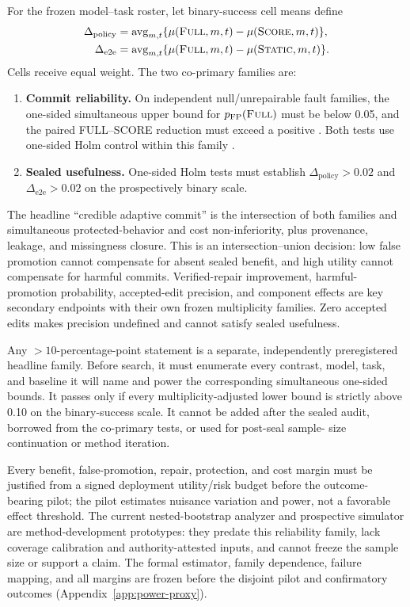 For the frozen model--task roster, let binary-success cell means define
\begin{align}
\Delta_{\mathrm{policy}}
  &= \operatorname{avg}_{m,t}\{\mu(\text{\textsc{Full}},m,t)
       -\mu(\text{\textsc{Score}},m,t)\},\\
\Delta_{\mathrm{e2e}}
  &= \operatorname{avg}_{m,t}\{\mu(\text{\textsc{Full}},m,t)
       -\mu(\text{\textsc{Static}},m,t)\}.
\end{align}
Cells receive equal weight.  The two co-primary families are:
\begin{enumerate}
  \item \textbf{Commit reliability.}  On independent null/unrepairable fault
  families, the one-sided simultaneous upper bound for
  \(p_{\mathrm{FP}}(\text{\textsc{Full}})\) must be below 0.05, and the paired
  FULL--SCORE reduction must exceed a positive
  .
  Both tests use one-sided Holm control within this family
  \citep{holm1979simple}.
  \item \textbf{Sealed usefulness.}  One-sided Holm tests must establish
  \(\Delta_{\mathrm{policy}}>0.02\) and
  \(\Delta_{\mathrm{e2e}}>0.02\) on the prospectively binary scale.
\end{enumerate}
The headline ``credible adaptive commit'' is the intersection of both families
and simultaneous protected-behavior and cost non-inferiority, plus provenance,
leakage, and missingness closure.  This is an intersection--union decision: low
false promotion cannot compensate for absent sealed benefit, and high utility
cannot compensate for harmful commits.  Verified-repair improvement, harmful-
promotion probability, accepted-edit precision, and component effects are key
secondary endpoints with their own frozen multiplicity families.  Zero accepted
edits makes precision undefined and cannot satisfy sealed usefulness.

Any \(>10\)-percentage-point statement is a separate, independently
preregistered headline family.  Before search, it must enumerate every contrast,
model, task, and baseline it will name and power the corresponding simultaneous
one-sided bounds.  It passes only if every multiplicity-adjusted lower bound is
strictly above 0.10 on the binary-success scale.  It cannot be added after the
sealed audit, borrowed from the co-primary tests, or used for post-seal sample-
size continuation or method iteration.

Every benefit, false-promotion, repair, protection, and cost margin must be
justified from a signed deployment utility/risk budget before the outcome-
bearing pilot; the pilot estimates nuisance variation and power, not a favorable
effect threshold.  The current nested-bootstrap analyzer and prospective simulator are
method-development prototypes: they predate this reliability family, lack
coverage calibration and authority-attested inputs, and cannot freeze the
sample size or support a claim.  The formal estimator, family dependence,
failure mapping, and all margins are frozen before the disjoint pilot and
confirmatory outcomes (Appendix~\ref{app:power-proxy}).

